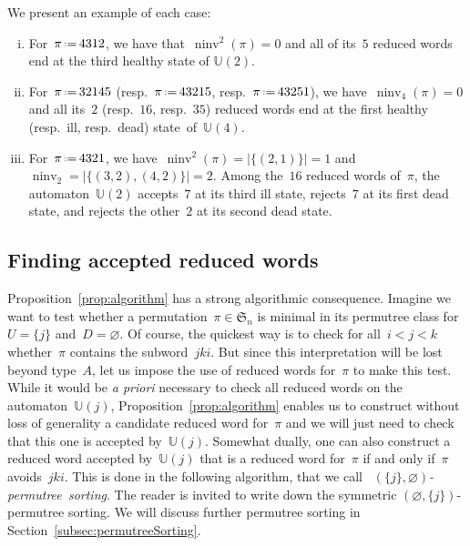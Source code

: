 \documentclass[ALCO]{cedram}
\newcommand{\fS}{\mathfrak{S}}
\newcommand{\eqdef}{\mbox{\,\raisebox{0.2ex}{\scriptsize\ensuremath{\mathrm:}}\ensuremath{=}\,}}
\newcommand{\defn}[1]{\textsl{\color{darkblue} #1}}
\newcommand{\apriori}{\textit{a priori}}
\DeclareMathOperator{\ninv}{ninv}
\newcommand{\automatonU}{\mathbb{U}}
\begin{document}
\begin{example}\label{exm:sameStateAcceptedReducedExpressionsRefined}
We present an example of each case:
\begin{enumerate}[(i)]
	\item For~$\pi \eqdef 4312$, we have that~$\ninv^2(\pi)=0$ and all of its~$5$ reduced words end at the third healthy state of $\automatonU(2)$.
	\item For~$\pi \eqdef 32145$ (resp.~$\pi \eqdef 43215$, resp.~$\pi \eqdef 43251$), we have~$\ninv_4(\pi) = 0$ and all its~$2$ (resp.~$16$, resp.~$35$) reduced words end at the first healthy (resp.~ill, resp.~dead) state~of~$\automatonU(4)$.
	\item For~$\pi \eqdef 4321$, we have~$\ninv^2(\pi) = |\{(2,1)\}| = 1$ and $\ninv_2 = |\{(3,2),(4,2)\}| = 2$. Among the~$16$ reduced words of~$\pi$, the automaton~$\automatonU(2)$ accepts~$7$ at its third ill state, rejects~$7$ at its first dead state, and rejects the other~$2$ at its second dead state.
\end{enumerate}
\end{example}

\subsection{Finding accepted reduced words}

Proposition~\ref{prop:algorithm} has a strong algorithmic consequence.
Imagine we want to test whether a permutation~$\pi \in \fS_n$ is minimal in its permutree class for~$U = \{j\}$ and~$D = \varnothing$.
Of course, the quickest way is to check for all~$i < j < k$ whether~$\pi$ contains the subword~$jki$.
But since this interpretation will be lost beyond type~$A$, let us impose the use of reduced words for~$\pi$ to make this test.
While it would be \apriori{} necessary to check all reduced words on the automaton~$\automatonU(j)$, Proposition~\ref{prop:algorithm} enables us to construct without loss of generality a candidate reduced word for~$\pi$ and we will just need to check that this one is accepted by~$\automatonU(j)$.
Somewhat dually, one can also construct a reduced word accepted by~$\automatonU(j)$ that is a reduced word for~$\pi$ if and only if~$\pi$ avoids~$jki$.
This is done in the following algorithm, that we call \mbox{\defn{$(\{j\}, \varnothing)$-permutree sorting}}.
The reader is invited to write down the symmetric $(\varnothing, \{j\})$-permutree sorting.
We will discuss further permutree sorting in Section~\ref{subsec:permutreeSorting}.
\end{document}
